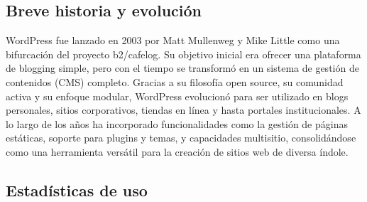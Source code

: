 \subsection{Breve historia y evolución}

WordPress\cite{Wordpress} fue lanzado en 2003 por Matt Mullenweg y Mike Little como una bifurcación del proyecto b2/cafelog. Su objetivo inicial era ofrecer una plataforma de blogging simple, pero con el tiempo se transformó en un sistema de gestión de contenidos (CMS) completo. Gracias a su filosofía open source, su comunidad activa y su enfoque modular, WordPress evolucionó para ser utilizado en blogs personales, sitios corporativos, tiendas en línea y hasta portales institucionales. A lo largo de los años ha incorporado funcionalidades como la gestión de páginas estáticas, soporte para plugins y temas, y capacidades multisitio, consolidándose como una herramienta versátil para la creación de sitios web de diversa índole.

\subsection{Estadísticas de uso}

